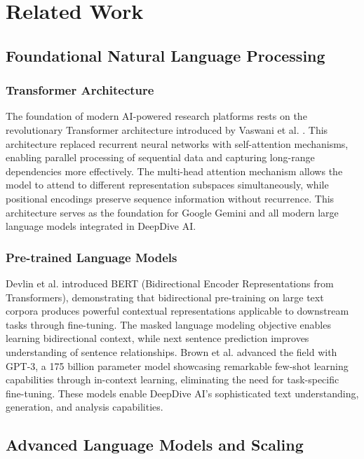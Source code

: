 \documentclass[conference]{IEEEtran}
\begin{document}
\section{Related Work}

\subsection{Foundational Natural Language Processing}

\subsubsection{Transformer Architecture}
The foundation of modern AI-powered research platforms rests on the revolutionary Transformer architecture introduced by Vaswani et al. \cite{ref1}. This architecture replaced recurrent neural networks with self-attention mechanisms, enabling parallel processing of sequential data and capturing long-range dependencies more effectively. The multi-head attention mechanism allows the model to attend to different representation subspaces simultaneously, while positional encodings preserve sequence information without recurrence. This architecture serves as the foundation for Google Gemini and all modern large language models integrated in DeepDive AI.

\subsubsection{Pre-trained Language Models}
Devlin et al. \cite{ref5} introduced BERT (Bidirectional Encoder Representations from Transformers), demonstrating that bidirectional pre-training on large text corpora produces powerful contextual representations applicable to downstream tasks through fine-tuning. The masked language modeling objective enables learning bidirectional context, while next sentence prediction improves understanding of sentence relationships. Brown et al. \cite{ref2} advanced the field with GPT-3, a 175 billion parameter model showcasing remarkable few-shot learning capabilities through in-context learning, eliminating the need for task-specific fine-tuning. These models enable DeepDive AI's sophisticated text understanding, generation, and analysis capabilities.

\subsection{Advanced Language Models and Scaling}
\end{document}
